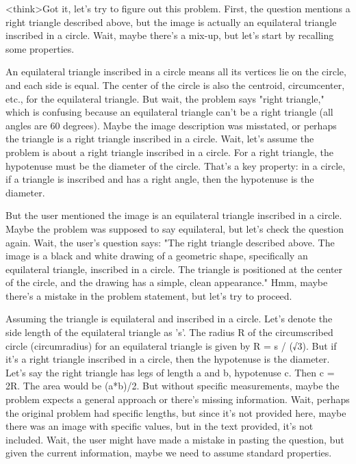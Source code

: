 <think>Got it, let's try to figure out this problem. First, the question mentions a right triangle described above, but the image is actually an equilateral triangle inscribed in a circle. Wait, maybe there's a mix-up, but let's start by recalling some properties. 

An equilateral triangle inscribed in a circle means all its vertices lie on the circle, and each side is equal. The center of the circle is also the centroid, circumcenter, etc., for the equilateral triangle. But wait, the problem says "right triangle," which is confusing because an equilateral triangle can't be a right triangle (all angles are 60 degrees). Maybe the image description was misstated, or perhaps the triangle is a right triangle inscribed in a circle. Wait, let's assume the problem is about a right triangle inscribed in a circle. For a right triangle, the hypotenuse must be the diameter of the circle. That's a key property: in a circle, if a triangle is inscribed and has a right angle, then the hypotenuse is the diameter. 

But the user mentioned the image is an equilateral triangle inscribed in a circle. Maybe the problem was supposed to say equilateral, but let's check the question again. Wait, the user's question says: "The right triangle described above. The image is a black and white drawing of a geometric shape, specifically an equilateral triangle, inscribed in a circle. The triangle is positioned at the center of the circle, and the drawing has a simple, clean appearance." Hmm, maybe there's a mistake in the problem statement, but let's try to proceed. 

Assuming the triangle is equilateral and inscribed in a circle. Let's denote the side length of the equilateral triangle as 's'. The radius R of the circumscribed circle (circumradius) for an equilateral triangle is given by R = s / (√3). But if it's a right triangle inscribed in a circle, then the hypotenuse is the diameter. Let's say the right triangle has legs of length a and b, hypotenuse c. Then c = 2R. The area would be (a*b)/2. But without specific measurements, maybe the problem expects a general approach or there's missing information. Wait, perhaps the original problem had specific lengths, but since it's not provided here, maybe there was an image with specific values, but in the text provided, it's not included. Wait, the user might have made a mistake in pasting the question, but given the current information, maybe we need to assume standard properties. 

